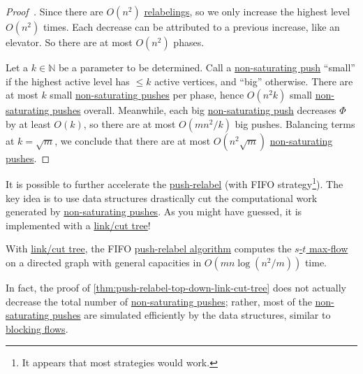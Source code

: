 \begin{proof}[Proof~\cite{cheriyan1999analysis}]
	Since there are \(O(n^2)\) \hyperref[algo:push-relabel-relabel]{relabelings}, so we only increase the highest level \(O(n^2)\) times. Each decrease can be attributed to a previous increase, like an elevator. So there are at most \(O(n^2)\) phases.

	Let a \(k \in \mathbb{N} \) be a parameter to be determined. Call a \hyperref[algo:push-relabel-push-non-saturating]{non-saturating push} ``small'' if the highest active level has \(\leq k\) active vertices, and ``big'' otherwise. There are at most \(k\) small \hyperref[algo:push-relabel-push-non-saturating]{non-saturating pushes} per phase, hence \(O(n^2 k)\) small \hyperref[algo:push-relabel-push-non-saturating]{non-saturating pushes} overall. Meanwhile, each big \hyperref[algo:push-relabel-push-non-saturating]{non-saturating push} decreases \(\Phi \) by at least \(O(k)\), so there are at most \(O(mn^2 / k)\) big pushes. Balancing terms at \(k = \sqrt{m} \), we conclude that there are at most \(O(n^2 \sqrt{m} )\) \hyperref[algo:push-relabel-push-non-saturating]{non-saturating pushes}.
\end{proof}

It is possible to further accelerate the \hyperref[algo:push-relabel]{push-relabel} (with FIFO strategy\footnote{It appears that most strategies would work.}). The key idea is to use data structures drastically cut the computational work generated by \hyperref[algo:push-relabel-push-non-saturating]{non-saturating pushes}. As you might have guessed, it is implemented with a \hyperref[def:link-cut-tree]{link/cut tree}!

\begin{theorem}\label{thm:push-relabel-top-down-link-cut-tree}
	With \hyperref[def:link-cut-tree]{link/cut tree}, the FIFO \hyperref[algo:push-relabel]{push-relabel algorithm} computes the \hyperref[prb:s-t-max-flow]{\(s\)-\(t\) max-flow} on a directed graph with general capacities in \(O(mn \log (n^2 / m))\) time.
\end{theorem}

\begin{note}
	In fact, the proof of \autoref{thm:push-relabel-top-down-link-cut-tree} does not actually decrease the total number of \hyperref[algo:push-relabel-push-non-saturating]{non-saturating pushes}; rather, most of the \hyperref[algo:push-relabel-push-non-saturating]{non-saturating pushes} are simulated efficiently by the data structures, similar to \hyperref[def:blocking-flow]{blocking flows}.
\end{note}